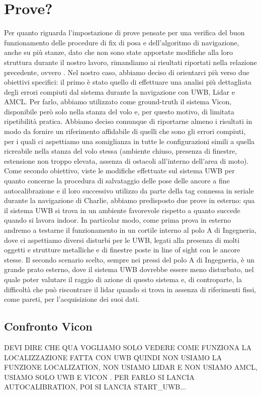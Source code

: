 \section{Prove?}
Per quanto riguarda l'impostazione di prove pensate per una verifica del buon funzionamento delle procedure di fix di posa e dell'algoritmo di navigazione, anche su più stanze, dato che non sono state apportate modifiche alla loro struttura durante il nostro lavoro, rimandiamo ai risultati riportati nella relazione precedente, ovvero \cite{ptvlocalizzazione}.
Nel nostro caso, abbiamo deciso di orientarci più verso due obiettivi specifici: il primo è stato quello di effettuare una analisi più dettagliata degli errori compiuti dal sistema durante la navigazione con UWB, Lidar e AMCL. Per farlo, abbiamo utilizzato come ground-truth il sistema Vicon, disponibile però solo nella stanza del volo e, per questo motivo, di limitata ripetibilità pratica. Abbiamo deciso comunque di riportarne almeno i risultati in modo da fornire un riferimento affidabile di quelli che sono gli errori compiuti, per i quali ci aspettiamo una somiglianza in tutte le configurazioni simili a quella ricreabile nella stanza del volo stessa (ambiente chiuso, presenza di finestre, estensione non troppo elevata, assenza di ostacoli all'interno dell'area di moto). Come secondo obiettivo, viste le modifiche effettuate sul sistema UWB per quanto concerne la procedura di salvataggio delle pose delle ancore a fine autocalibrazione e il loro successivo utilizzo da parte della tag connessa in seriale durante la navigazione di Charlie, abbiamo predisposto due prove in esterno: qua il sistema UWB si trova in un ambiente favorevole rispetto a quanto succede quando si lavora indoor. In particolar modo, come prima prova in esterno andremo a testarne il funzionamento in un cortile interno al polo A di Ingegneria, dove ci aspettiamo diversi disturbi per le UWB, legati alla presenza di molti oggetti e strutture metalliche e di finestre poste in line of sight con le ancore stesse. Il secondo scenario scelto, sempre nei pressi del polo A di Ingegneria, è un grande prato esterno, dove il sistema UWB dovrebbe essere meno disturbato, nel quale poter valutare il raggio di azione di questo sistema e, di controparte, la difficoltà che può riscontrare il lidar quando si trova in assenza di riferimenti fissi, come pareti, per l'acquisizione dei suoi dati.

\subsection{Confronto Vicon}
DEVI DIRE CHE QUA VOGLIAMO SOLO VEDERE COME FUNZIONA LA LOCALIZZAZIONE FATTA CON UWB QUINDI NON USIAMO LA FUNZIONE LOCALIZATION, NON USIAMO LIDAR E NON USIAMO AMCL, USIAMO SOLO UWB E VICON . PER FARLO SI LANCIA AUTOCALIBRATION, POI SI LANCIA START\_UWB...

